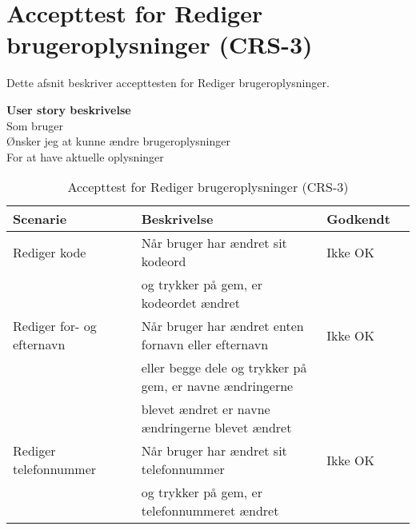 \section{Accepttest for Rediger brugeroplysninger (CRS-3)}
Dette afsnit beskriver accepttesten for Rediger brugeroplysninger.

\textbf{User story beskrivelse} \\
Som bruger\\
Ønsker jeg at kunne ændre brugeroplysninger \\
For at have aktuelle oplysninger

\begin{table}[H]
	\centering
	\begin{tabular}{|ll|l|ll|} \hline
		\textbf{Scenarie} &  & \textbf{Beskrivelse}&  \textbf{Godkendt}&  \\ \hline
		Rediger kode&  &  Når bruger har ændret sit kodeord &  Ikke OK&  \\
		& & og trykker på gem, er kodeordet ændret& & \\ \hline
		Rediger for- og efternavn&  &  Når bruger har ændret enten fornavn eller efternavn &  Ikke OK&  \\
		& & eller begge dele og trykker på gem, er navne ændringerne & & \\
		& & blevet ændret er navne ændringerne blevet ændret& & \\ \hline
		Rediger telefonnummer&  &  Når bruger har ændret sit telefonnummer &  Ikke OK&  \\
		& & og trykker på gem, er telefonnummeret ændret& & \\ \hline
	\end{tabular}
	\caption{Accepttest for Rediger brugeroplysninger (CRS-3)}
	\label{AcceptRedigerBruger}
\end{table}